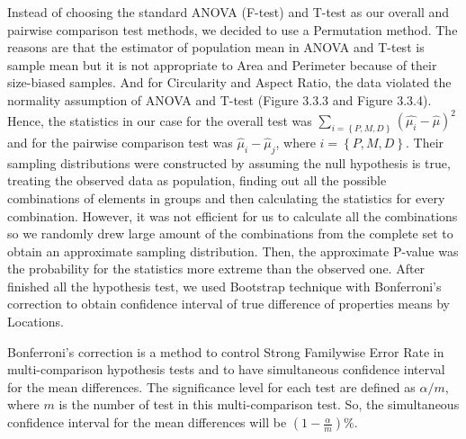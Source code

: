 \documentclass{article}\usepackage[]{graphicx}\usepackage[]{color}
\numberwithin{figure}{subsection} %
\numberwithin{table}{subsection} %
\begin{document}
Instead of choosing the standard ANOVA (F-test) and T-test as our overall and pairwise comparison test methods, we decided to use a Permutation method. The reasons are that the estimator of population mean in ANOVA and T-test is sample mean but it is not appropriate to Area and Perimeter because of their size-biased samples. And for Circularity and Aspect Ratio, the data violated the normality assumption of ANOVA and T-test (Figure 3.3.3 and Figure 3.3.4). Hence, the statistics in our case for the overall test was $\sum_{i=\left \{P,M,D\right\}}{(\widehat{{\mu}_{i}}-\widehat{{\mu}})}^{2}$ and for the pairwise comparison test was $\widehat{\mu}_{i}-\widehat{\mu}_{j}$, where $i=\left \{P,M,D\right\}$. Their sampling distributions were constructed by assuming the null hypothesis is true, treating the observed data as population, finding out all the possible combinations of elements in groups and then calculating the statistics for every combination. However, it was not efficient for us to calculate all the combinations so we randomly drew large amount of the combinations from the complete set to obtain an approximate sampling distribution. Then, the approximate P-value was the probability for the statistics more extreme than the observed one. After finished all the hypothesis test, we used Bootstrap technique with Bonferroni's correction to obtain confidence interval of true difference of properties means by Locations.

Bonferroni's correction is a method to control Strong Familywise Error Rate in multi-comparison hypothesis tests and to have simultaneous confidence interval for the mean differences. The significance level for each test are defined as $\alpha/m$, where $m$ is the number of test in this multi-comparison test. So, the simultaneous confidence interval for the mean differences will be $(1-\frac{\alpha}{m})\%$.
\end{document}
